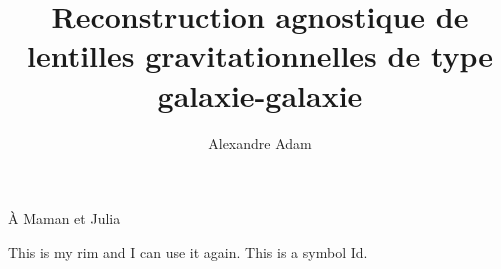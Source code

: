 \documentclass[
  normalmargins,
  11pt,
  openany,
  onehalfspacing,
]{ut-thesis}
\author{Alexandre Adam}
\title{Reconstruction agnostique de lentilles gravitationnelles de type galaxie-galaxie}
\begin{document}
  \frontmatter
    \maketitle

    \begin{resume}
    \end{resume}
    \begin{abstract}
    \end{abstract}

    \tableofcontents
    \listoftables
    \listoffigures
    \printglossaries

        \clearpage
    \begin{dedication}
      À Maman et Julia
    \end{dedication}
    \begin{acknowledgements}

           



            
    \end{acknowledgements}
  \mainmatter
    
    This is my \gls{rim} and I can use it again. This is a symbol \gls{Id}.


  \appendix
  \backmatter
\end{document}

